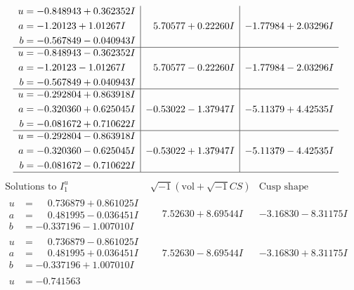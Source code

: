 \documentclass[1p]{elsarticle_modified}
\theoremstyle{definition}
\newcommand{\I}{\sqrt{-1}}
\begin{document}
$$\begin{array}{c|c|c}
\begin{aligned}
u &= -0.848943 + 0.362352 I \\
a &= -1.20123 + 1.01267 I \\
b &= -0.567849 - 0.040943 I\end{aligned}
 & \phantom{-}5.70577 + 0.22260 I & -1.77984 + 2.03296 I \\ \hline\begin{aligned}
u &= -0.848943 - 0.362352 I \\
a &= -1.20123 - 1.01267 I \\
b &= -0.567849 + 0.040943 I\end{aligned}
 & \phantom{-}5.70577 - 0.22260 I & -1.77984 - 2.03296 I \\ \hline\begin{aligned}
u &= -0.292804 + 0.863918 I \\
a &= -0.320360 + 0.625045 I \\
b &= -0.081672 + 0.710622 I\end{aligned}
 & -0.53022 - 1.37947 I & -5.11379 + 4.42535 I \\ \hline\begin{aligned}
u &= -0.292804 - 0.863918 I \\
a &= -0.320360 - 0.625045 I \\
b &= -0.081672 - 0.710622 I\end{aligned}
 & -0.53022 + 1.37947 I & -5.11379 - 4.42535 I\\
 \hline 
 \end{array}$$\newpage$$\begin{array}{c|c|c}  
\text{Solutions to }I^u_{1}& \I (\text{vol} + \sqrt{-1}CS) & \text{Cusp shape}\\
 \hline 
\begin{aligned}
u &= \phantom{-}0.736879 + 0.861025 I \\
a &= \phantom{-}0.481995 - 0.036451 I \\
b &= -0.337196 - 1.007010 I\end{aligned}
 & \phantom{-}7.52630 + 8.69544 I & -3.16830 - 8.31175 I \\ \hline\begin{aligned}
u &= \phantom{-}0.736879 - 0.861025 I \\
a &= \phantom{-}0.481995 + 0.036451 I \\
b &= -0.337196 + 1.007010 I\end{aligned}
 & \phantom{-}7.52630 - 8.69544 I & -3.16830 + 8.31175 I \\ \hline\begin{aligned}
u &= -0.741563\phantom{ +0.000000I} \\

\end{aligned}
\end{array}$$
\end{document}
